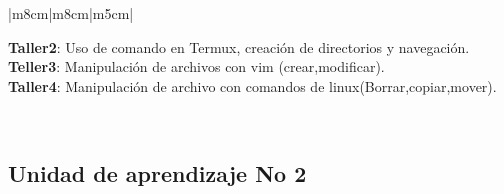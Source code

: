 \documentclass[a4paper,12pt,spanish]{article}
\begin{document}
\begin{tabular}[H]{|m{8cm}|m{8cm}|m{5cm}|}
\begin{minipage}[H]{1.0\linewidth}
    \textbf{Taller2}: Uso de comando en Termux, creación de directorios y navegación.\\
    
  \noindent  \textbf{Teller3}: Manipulación de archivos con vim (crear,modificar).\\
    
    \textbf{Taller4}: Manipulación de archivo con comandos de linux(Borrar,copiar,mover).\\
  \end{minipage}

  \\ \hline
  
\end{tabular}


\newpage
\subsection{Unidad de aprendizaje No 2}
\label{sec:unid-de-aprend3}
\end{document}
